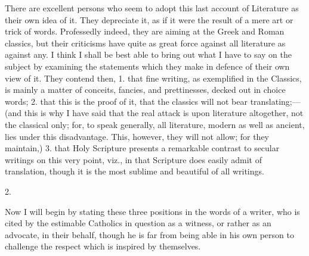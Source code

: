 There are excellent persons who seem to adopt this last account of
Literature as their own idea of it. They depreciate it, as if it were
the result of a mere art or trick of words. Professedly indeed, they
are aiming at the Greek and Roman classics, but their criticisms have
quite as great force against all literature as against any. I think I
shall be best able to bring out what I have to say on the subject by
examining the statements which they make in defence of their own view
of it. They contend then, 1. that fine writing, as exemplified in the
Classics, is mainly a matter of conceits, fancies, and prettinesses,
decked out in choice words; 2. that this is the proof of it, that the
classics will not bear translating;—(and this is why I have said
that the real attack is upon literature altogether, not the classical
only; for, to speak generally, all literature, modern as well as
ancient, lies under this disadvantage. This, however, they will not
allow; for they maintain,) 3. that Holy Scripture presents a
remarkable contrast to secular writings on this very point, viz., in that Scripture does easily admit of translation, though it is
the most sublime and beautiful of all writings.

2.

Now I will begin by stating these three positions in the words of a
writer, who is cited by the estimable Catholics in question as a
witness, or rather as an advocate, in their behalf, though he is far
from being able in his own person to challenge the respect which is
inspired by themselves.

